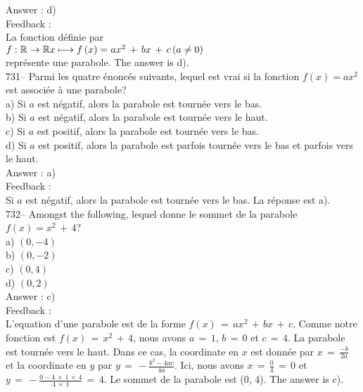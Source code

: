 ﻿\documentclass[letterpaper, 12pt]{article}
\begin{document}
Answer : d)\\

Feedback : \\
La fonction d\'efinie par\\
$f :\mathbb{R}\rightarrow\mathbb{R}\\
x\longmapsto f\left( x\right) =ax^{2}\,+\,bx\,+\,c \left( a\neq 0 \right)$
\\
repr\'esente une parabole.  The answer is d).\\

731-- Parmi les quatre \'enonc\'es suivants, lequel est vrai si la fonction
$f(x)=ax^{2}$ est associ\'ee \`a une parabole?\\
a) Si $a$ est n\'egatif, alors la parabole est tourn\'ee vers le bas.\\
b) Si $a$ est n\'egatif, alors la parabole est tourn\'ee vers le haut.  \\
c) Si $a$ est positif, alors la parabole est tourn\'ee vers le bas.\\
d) Si $a$ est positif, alors la parabole est parfois tourn\'ee vers le bas
et parfois vers le haut.\\

Answer : a)\\

Feedback : \\
Si $a$ est n\'egatif, alors la parabole est tourn\'ee vers le bas.  La
r\'eponse est a).\\

732-- Amongst the following, lequel donne le sommet de la parabole
$f\left( x\right) =x^{2}\,+\,4$?\\
a) $(0,-4)$\\
b) $(0,-2)$\\
c) $(0,4)$\\
d) $(0,2)$\\

Answer : c)\\

Feedback : \\
L'equation d'une parabole est de la forme
$f(x)\,=\,ax^2\,+\,bx\,+\,c$. Comme notre fonction est
$f(x)\,=\,x^2\,+\,4$, nous avons $a\,=\,1$, $b\,=\,0$ et $c\,=\,4$.
La parabole est tourn\'ee vers le haut. Dans ce cas, la coordinate
en $x$ est donn\'ee par $x\,=\, \frac{-b}{2a}$ et la coordinate en
$y$ par $y\,=\, -\frac{b^2-4ac}{4a}$. Ici, nous avons
$x\,=\,\frac{0}{4}\,=\,0$ et
$y\,=\,-\frac{0-4\,\times\,1\,\times\,4}{4\,\times\,1}\,=\,4$. Le
sommet de la parabole est (0, 4). The answer is c).
\end{document}
